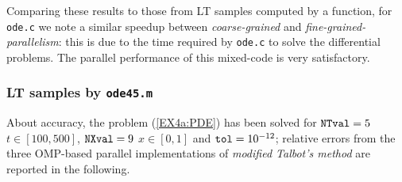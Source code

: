 \documentclass[a4paper,10pt]{report}%
\begin{document}
\noindent Comparing these results to those from LT samples computed by a function, for {\tt ode.c} we
note a similar speedup between {\em coarse-grained} and {\em fine-grained-parallelism}: this is due to
the time required by {\tt ode.c} to solve the differential problems. The parallel performance of this
mixed-code is very satisfactory.


\subsubsection{LT samples by {\tt ode45.m}}
About accuracy, the problem (\ref{EX4a:PDE}) has been solved for ${\tt NTval}=5$ $t\in[100, 500]$,
${\tt NXval}=9$ $x\in[0,1]$ and ${\tt tol}=10^{-12}$; relative errors from the three OMP-based parallel
implementations of {\em modified Talbot's method} are reported in the following.
\end{document}
